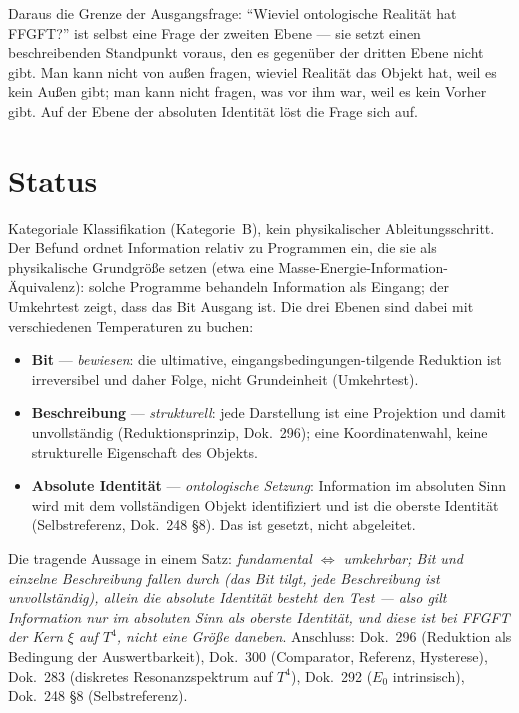 Daraus die Grenze der Ausgangsfrage: \enquote{Wieviel ontologische Realität hat
FFGFT?} ist selbst eine Frage der zweiten Ebene --- sie setzt einen beschreibenden
Standpunkt voraus, den es gegenüber der dritten Ebene nicht gibt. Man kann nicht von
außen fragen, wieviel Realität das Objekt hat, weil es kein Außen gibt; man kann
nicht fragen, was vor ihm war, weil es kein Vorher gibt. Auf der Ebene der absoluten
Identität löst die Frage sich auf.

\section{Status}

Kategoriale Klassifikation (Kategorie~B), kein physikalischer Ableitungsschritt.
Der Befund ordnet Information relativ zu Programmen ein, die sie als
physikalische Grundgröße setzen (etwa eine Masse-Energie-Information-Äquivalenz):
solche Programme behandeln Information als Eingang; der Umkehrtest zeigt, dass
das Bit Ausgang ist. Die drei Ebenen sind dabei mit verschiedenen Temperaturen
zu buchen:
\begin{itemize}
  \item \textbf{Bit} --- \emph{bewiesen}: die ultimative, eingangsbedingungen-tilgende
    Reduktion ist irreversibel und daher Folge, nicht Grundeinheit (Umkehrtest).
  \item \textbf{Beschreibung} --- \emph{strukturell}: jede Darstellung ist eine
    Projektion und damit unvollständig (Reduktionsprinzip, Dok.~296); eine
    Koordinatenwahl, keine strukturelle Eigenschaft des Objekts.
  \item \textbf{Absolute Identität} --- \emph{ontologische Setzung}: Information
    im absoluten Sinn wird mit dem vollständigen Objekt identifiziert und ist die
    oberste Identität (Selbstreferenz, Dok.~248 §8). Das ist gesetzt, nicht
    abgeleitet.
\end{itemize}
Die tragende Aussage in einem Satz: \emph{fundamental $\Leftrightarrow$
umkehrbar; Bit und einzelne Beschreibung fallen durch (das Bit tilgt, jede
Beschreibung ist unvollständig), allein die absolute Identität besteht den Test
--- also gilt Information nur im absoluten Sinn als oberste Identität, und diese
ist bei FFGFT der Kern $\xi$ auf $T^4$, nicht eine Größe daneben}. Anschluss:
Dok.~296 (Reduktion als Bedingung der Auswertbarkeit), Dok.~300 (Comparator,
Referenz, Hysterese), Dok.~283 (diskretes Resonanzspektrum auf $T^4$),
Dok.~292 ($E_0$ intrinsisch), Dok.~248 §8 (Selbstreferenz).
